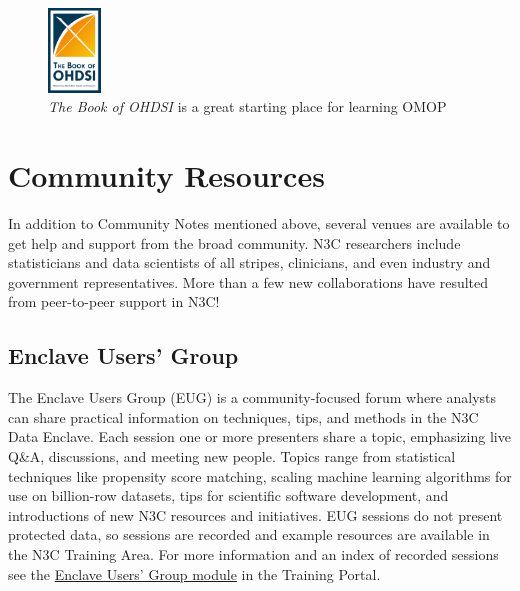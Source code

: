 \documentclass[
  letterpaper,
  DIV=11,
  numbers=noendperiod]{scrreprt}
\begin{document}
\begin{figure}

{\centering \includegraphics[width=0.125\textwidth,height=\textheight]{chapters/images/support/image-20-ohdsi.png}

}

\caption{\label{fig-support-ohdsi}\emph{The Book of OHDSI} is a great
starting place for learning OMOP}

\end{figure}

\hypertarget{sec-support-community}{%
\section{Community Resources}\label{sec-support-community}}

In addition to Community Notes mentioned above, several venues are
available to get help and support from the broad community. N3C
researchers include statisticians and data scientists of all stripes,
clinicians, and even industry and government representatives. More than
a few new collaborations have resulted from peer-to-peer support in N3C!

\hypertarget{sec-support-community-eug}{%
\subsection{Enclave Users' Group}\label{sec-support-community-eug}}

The Enclave Users Group (EUG) is a community-focused forum where
analysts can share practical information on techniques, tips, and
methods in the N3C Data Enclave. Each session one or more presenters
share a topic, emphasizing live Q\&A, discussions, and meeting new
people. Topics range from statistical techniques like propensity score
matching, scaling machine learning algorithms for use on billion-row
datasets, tips for scientific software development, and introductions of
new N3C resources and initiatives. EUG sessions do not present protected
data, so sessions are recorded and example resources are available in
the N3C Training Area. For more information and an index of recorded
sessions see the
\href{https://unite.nih.gov/workspace/module/view/latest/ri.workshop.main.module.e7b83a8c-545e-49ac-8714-f34bfa7f7767?view=focus\&Id=19}{Enclave
Users' Group module} in the Training Portal.
\end{document}
